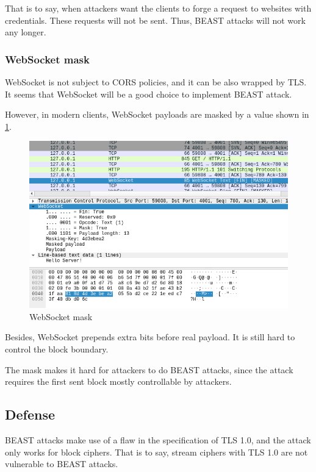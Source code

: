 \documentclass{acm_proc_article-sp}
\begin{document}
That is to say, when attackers want the clients to forge a request to websites with
credentials. These requests will not be sent. Thus, BEAST attacks will not work
any longer.

\subsubsection{WebSocket mask}
WebSocket is not subject to CORS policies, and it can be also wrapped by TLS.
It seems that WebSocket will be a good choice to implement BEAST attack.

However, in modern clients, WebSocket payloads are masked by a value shown in \ref{fig:websocket-mask}.

\begin{figure}[htb]
    \centering
    \includegraphics[keepaspectratio, width=\linewidth]{./figures/websocket-mask.png}
    \caption{WebSocket mask}
    \label{fig:websocket-mask}
\end{figure}

Besides, WebSocket prepends extra bits before real payload. It is still hard to
control the block boundary.

The mask makes it hard for attackers to do BEAST attacks, since the attack requires
the first sent block mostly controllable by attackers.

\subsection{Defense}
BEAST attacks make use of a flaw in the specification of TLS 1.0, and the attack only
works for block ciphers. That is to say, stream ciphers with TLS 1.0 are not
vulnerable to BEAST attacks.
\end{document}
